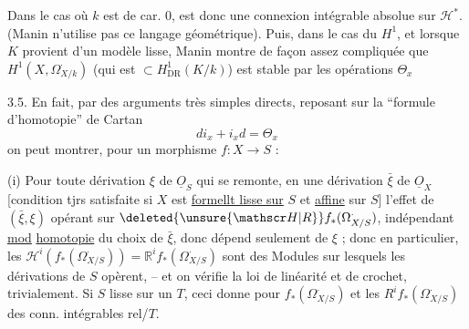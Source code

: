 Dans le cas où $k$ est de car. $0$,  est donc une connexion intégrable absolue sur $\mathscr H^*$. (Manin n'utilise pas ce langage géométrique). Puis, dans le cas du $H^1$, et lorsque $K$  provient d'un modèle  lisse, Manin montre de façon assez compliquée que $H^1(X,\Omega^{\cdot}_{X/k})$ (qui est $\subset H^1_{\mathrm{DR}}(K/k)$) est stable par les opérations $\Theta_x$

3.5. En fait, par des arguments très simples directs,  reposant sur la ``formule d'homotopie'' de Cartan
\[
d i_x+i_x d=\Theta_x
\]
on peut montrer, pour un morphisme $f:X\longrightarrow S$ :

(i) Pour toute dérivation $\xi$ de $\underline O_S$ qui se remonte,   en une dérivation $\bar\xi$ de $\underline O_X$ [condition tjrs satisfaite si $X$ est  \uline{formellt lisse sur} $S$ et \uline{affine} sur $S$] l'effet de $(\bar\xi,\xi)$ opérant sur $\deleted{\unsure{\mathscr H|R}} f_*(\Omega^{\cdot}_{X/S})$,  indépendant \uline{mod} \uline{homotopie}  du choix de $\bar\xi$, donc dépend seulement de $\xi$ ; donc en particulier,  les $\mathscr H^i(f_*(\Omega^{\cdot}_{X/S}))=\mathbb R^i f_*(\Omega^{\cdot}_{X/S})$ sont des Modules sur lesquels les dérivations de $S$ opèrent, -- et on vérifie la loi de linéarité et de crochet, trivialement. Si $S$ lisse sur un $T$, ceci donne pour $f_*(\Omega^{\cdot}_{X/S})$ et  les $R^i f_*(\Omega^{\cdot}_{X/S})$ des conn. intégrables rel/$T$.

